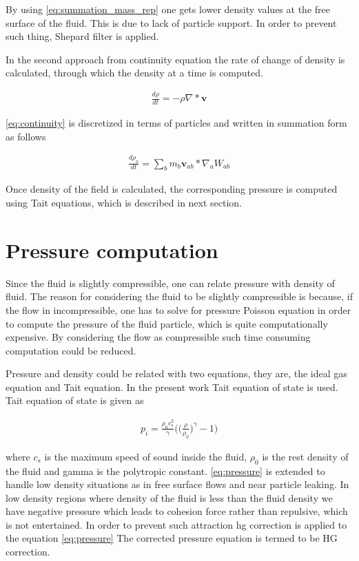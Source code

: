 By using \eqref{eq:summation_mass_rep} one gets lower density values
at the free surface of the fluid. This is due to lack of particle
support. In order to prevent such thing, Shepard filter is applied.

In the second approach from continuity equation the rate of change of
density is calculated, through which the density at a time is
computed.

\begin{align}
  \label{eq:continuity}
    \frac{d\rho}{dt} = -\rho \nabla * \textbf{v}
\end{align}

\eqref{eq:continuity} is discretized in terms of particles and written
in summation form as follows

\begin{align}
  \label{eq:sph_continuity}
    \frac{d\rho_a}{dt} = \sum_{b}m_b \textbf{v}_{ab} * \nabla_a W_{ab}
\end{align}

Once density of the field is calculated, the corresponding pressure is computed using
Tait equations, which is described in next section.


\section{Pressure computation}

Since the fluid is slightly compressible, one can relate pressure with density
of fluid. The reason for considering the fluid to be slightly compressible is because,
if the flow in incompressible, one has to solve for pressure Poisson equation in order to
compute the pressure of the fluid particle, which is quite computationally expensive.
By considering the flow as compressible such time consuming computation could be reduced.

Pressure and density could be related with two equations, they are, the ideal gas equation
and Tait equation. In the present work Tait equation of state is used. Tait equation of
state is given as

\begin{align}
  \label{eq:pressure}
  p_i = \frac{\rho_0 c_s^2 }{\gamma} \bigg(\bigg(\frac{\rho}{\rho_0}\bigg)^\gamma - 1 \bigg)
\end{align}

where $c_s$ is the maximum speed of sound inside the fluid, $\rho_0$ is
the rest density of the fluid and gamma is the polytropic constant.
\eqref{eq:pressure} is extended to handle low density situations as in
free surface flows and near particle leaking. In low density regions
where density of the fluid is less than the fluid density we have
negative pressure which leads to cohesion force rather than repulsive,
which is not entertained. In order to prevent such attraction hg
correction is applied to the equation \eqref{eq:pressure} The corrected
pressure equation is termed to be HG correction.

